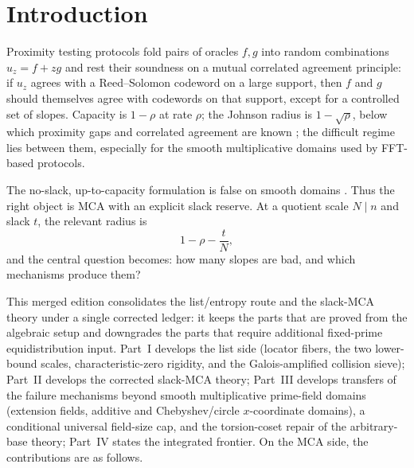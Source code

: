 \documentclass[11pt]{article}
\theoremstyle{definition}
\begin{document}
\begin{abstract}
The document closes with an integrated frontier: the final threshold statements are isolated as finite-field local-limit conjectures for locator fibers and residue lines, calibrated on both sides by the same two-scale, floor-corrected reserve.  We do not claim the full polynomial-field list theorem or the all-line MCA positive theorem as proved.

This strengthened version also promotes the stable high-agreement tangent material from the experimental notes into the main theory: the affine, no-loss CA, and projective-line numerators are exactly $r+1$ in the range $r\le (n-k)/3$, interleaved lists are unique for $r\le (n-k)/2$, and degree-$d$ finite power-curve ledgers have a theorem-backed $d(r+1)$ upper envelope with exactness under a split moving-root hypothesis.  Thus the high-agreement boundary layer is now solved, and the remaining frontier is explicitly the near-capacity quotient-profile and aperiodic local-limit problem.
\end{abstract}

\tableofcontents

\section{Introduction}\label{sec:intro}

Proximity testing protocols \cite{FRI,WHIR} fold pairs of oracles $f,g$ into random combinations $u_z=f+zg$ and rest their soundness on a mutual correlated agreement principle: if $u_z$ agrees with a Reed--Solomon codeword on a large support, then $f$ and $g$ should themselves agree with codewords on that support, except for a controlled set of slopes.  Capacity is $1-\rho$ at rate $\rho$; the Johnson radius is $1-\sqrt\rho$, below which proximity gaps and correlated agreement are known \cite{BCIKS20,BCHKS25}; the difficult regime lies between them, especially for the smooth multiplicative domains used by FFT-based protocols.

The no-slack, up-to-capacity formulation is false on smooth domains \cite{NoSlack}.  Thus the right object is MCA with an explicit slack reserve.  At a quotient scale $N\mid n$ and slack $t$, the relevant radius is
\[
        1-\rho-\frac{t}{N},
\]
and the central question becomes: how many slopes are bad, and which mechanisms produce them?

This merged edition consolidates the list/entropy route and the slack-MCA theory under a single corrected ledger: it keeps the parts that are proved from the algebraic setup and downgrades the parts that require additional fixed-prime equidistribution input.  Part~I develops the list side (locator fibers, the two lower-bound scales, characteristic-zero rigidity, and the Galois-amplified collision sieve); Part~II develops the corrected slack-MCA theory; Part~III develops transfers of the failure mechanisms beyond smooth multiplicative prime-field domains (extension fields, additive and Chebyshev/circle $x$-coordinate domains), a conditional universal field-size cap, and the torsion-coset repair of the arbitrary-base theory; Part~IV states the integrated frontier.  On the MCA side, the contributions are as follows.
\end{document}
